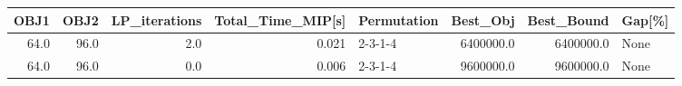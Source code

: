 \begin{tabular}{rrrrlrrl}
\toprule
 OBJ1 &  OBJ2 &  LP\_iterations &  Total\_Time\_MIP[s] & Permutation &   Best\_Obj &  Best\_Bound & Gap[\%] \\
\midrule
 64.0 &  96.0 &            2.0 &              0.021 &     2-3-1-4 &  6400000.0 &   6400000.0 &   None \\
 64.0 &  96.0 &            0.0 &              0.006 &     2-3-1-4 &  9600000.0 &   9600000.0 &   None \\
\bottomrule
\end{tabular}
